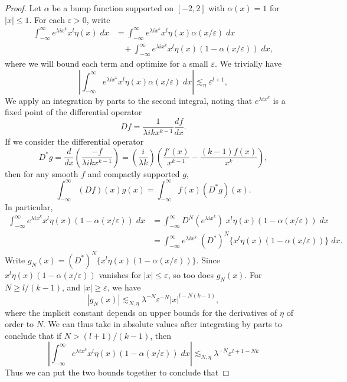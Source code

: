 \begin{proof}
  Let $\alpha$ be a bump function supported on $[-2,2]$ with $\alpha(x) = 1$ for $|x| \leq 1$. For each $\varepsilon > 0$, write
  \begin{align*}
    \int_{-\infty}^\infty e^{\lambda i x^k} x^l \eta(x)\; dx &= \int_{-\infty}^\infty e^{\lambda i x^k} x^l \eta(x) \alpha(x/\varepsilon)\; dx\\
    &\ \ \ \ + \int_{-\infty}^\infty e^{\lambda i x^k} x^l \eta(x) (1 - \alpha(x/\varepsilon))\; dx,
  \end{align*}
  where we will bound each term and optimize for a small $\varepsilon$. We trivially have
  \[ \left| \int_{-\infty}^\infty e^{\lambda i x^k} x^l \eta(x) \alpha(x/\varepsilon)\; dx \right| \lesssim_\eta \varepsilon^{l+1}, \]
  We apply an integration by parts to the second integral, noting that $e^{\lambda i x^k}$ is a fixed point of the differential operator
  \[ Df = \frac{1}{\lambda i k x^{k-1}} \frac{df}{dx}. \]
  If we consider the differential operator
  \[ D^*g = \frac{d}{dx} \left( \frac{-f}{\lambda i k x^{k-1}} \right) = \left( \frac{i}{\lambda k} \right) \left( \frac{f'(x)}{x^{k-1}} - \frac{(k-1) f(x)}{x^k} \right), \]
  then for any smooth $f$ and compactly supported $g$,
  \[ \int_{-\infty}^\infty (Df)(x) g(x) = \int_{-\infty}^\infty f(x) (D^* g)(x). \]
  In particular,
  \begin{align*}
    \int_{-\infty}^\infty e^{\lambda i x^k} x^l \eta(x) (1 - \alpha(x/\varepsilon))\; dx &= \int_{-\infty}^\infty D^N(e^{\lambda i x^k})\; x^l \eta(x) (1 - \alpha(x/\varepsilon))\; dx\\
    &= \int_{-\infty}^\infty e^{\lambda i x^k}\; (D^*)^N \{ x^l \eta(x) (1 - \alpha(x/\varepsilon)) \}\; dx.
  \end{align*}
  Write $g_N(x) = (D^*)^N \{ x^l \eta(x) (1 - \alpha(x/\varepsilon)) \}$. Since $x^l \eta(x) (1 - \alpha(x/\varepsilon))$ vanishes for $|x| \leq \varepsilon$, so too does $g_N(x)$. For $N \geq l/(k-1)$, and $|x| \geq \varepsilon$, we have
  \[ |g_N(x)| \lesssim_{N,\eta} \lambda^{-N} \varepsilon^{-N} |x|^{l - N(k-1)}, \]
  where the implicit constant depends on upper bounds for the derivatives of $\eta$ of order to $N$. We can thus take in absolute values after integrating by parts to conclude that if $N > (l+1)/(k-1)$, then
  \[ \left| \int_{-\infty}^\infty e^{\lambda i x^k} x^l \eta(x) (1 - \alpha(x/\varepsilon))\; dx \right| \lesssim_{N,\eta} \lambda^{-N} \varepsilon^{l + 1 - Nk} \]
  Thus we can put the two bounds together to conclude that

\end{proof}
